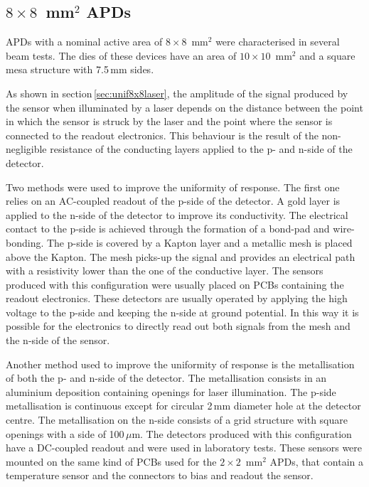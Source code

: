 \documentclass[review,number,sort&compress]{elsarticle}
\begin{document}
\subsection{$8 \times 8$~mm$^2$ APDs}

APDs with a nominal active area of $8 \times 8$~mm$^2$ were characterised in several beam tests.
The dies of these devices have an area of $10 \times 10$~mm$^2$ and a square mesa structure with 7.5\,mm sides.

As shown in section\,\ref{sec:unif8x8laser}, the amplitude of the signal produced by the sensor when illuminated by a laser depends on the distance between the point in which the sensor is struck by the laser and the point where the sensor is connected to the readout electronics.
This behaviour is the result of the non-negligible resistance of the conducting layers applied to the p- and n-side of the detector.

Two methods were used to improve the uniformity of response.
The first one relies on an AC-coupled readout of the p-side of the detector.
A gold layer is applied to the n-side of the detector to improve its conductivity.
The electrical contact to the p-side is achieved through the formation of a bond-pad and wire-bonding.
The p-side is covered by a Kapton layer and a metallic mesh is placed above the Kapton.
The mesh picks-up the signal and provides an electrical path with a resistivity lower than the one of the conductive layer.
The sensors produced with this configuration were usually placed on PCBs containing the readout electronics.
These detectors are usually operated by applying the high voltage to the p-side and keeping the n-side at ground potential.
In this way it is possible for the electronics to directly read out both signals from the mesh and the n-side of the sensor.

Another method used to improve the uniformity of response is the metallisation of both the p- and n-side of the detector.
The metallisation consists in an aluminium deposition containing openings for laser illumination.
The p-side metallisation is continuous except for circular 2\,mm diameter hole at the detector centre.
The metallisation on the n-side consists of a grid structure with square openings with a side of 100\,$\mu$m.
The detectors produced with this configuration have a DC-coupled readout and were used in laboratory tests.
These sensors were mounted on the same kind of PCBs used for the $2 \times 2$~mm$^2$ APDs, that contain a temperature sensor and the connectors to bias and readout the sensor.
\end{document}
